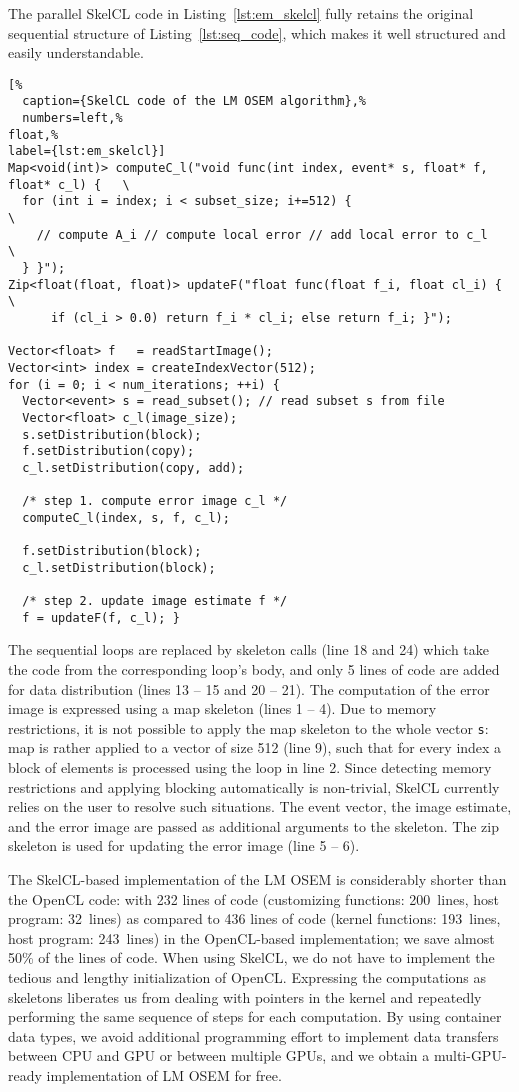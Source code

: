 The parallel SkelCL code in Listing~\ref{lst:em_skelcl} fully retains the original sequential structure of Listing~\ref{lst:seq_code}, which makes it well structured and easily understandable.
\begin{lstlisting}[%
  caption={SkelCL code of the LM OSEM algorithm},%
  numbers=left,%
float,%
label={lst:em_skelcl}]
Map<void(int)> computeC_l("void func(int index, event* s, float* f, float* c_l) {   \
  for (int i = index; i < subset_size; i+=512) {                                    \
    // compute A_i // compute local error // add local error to c_l                 \
  } }");
Zip<float(float, float)> updateF("float func(float f_i, float cl_i) {               \
      if (cl_i > 0.0) return f_i * cl_i; else return f_i; }");

Vector<float> f   = readStartImage();
Vector<int> index = createIndexVector(512);
for (i = 0; i < num_iterations; ++i) {
  Vector<event> s = read_subset(); // read subset s from file
  Vector<float> c_l(image_size);
  s.setDistribution(block);
  f.setDistribution(copy);
  c_l.setDistribution(copy, add);

  /* step 1. compute error image c_l */
  computeC_l(index, s, f, c_l);

  f.setDistribution(block);
  c_l.setDistribution(block);

  /* step 2. update image estimate f */
  f = updateF(f, c_l); }
\end{lstlisting}
The sequential loops are replaced by skeleton calls (line 18 and 24) which take the code from the corresponding loop's body, and only 5 lines of code are added for data distribution (lines 13 -- 15 and 20 -- 21).
The computation of the error image is expressed using a map skeleton (lines 1 -- 4).
Due to memory restrictions, it is not possible to apply the map skeleton to the whole vector \texttt{s}:
map is rather applied to a vector of size 512 (line 9), such that for every index a block of elements is processed using the loop in line 2.
Since detecting memory restrictions and applying blocking automatically is non-trivial, SkelCL currently relies on the user to resolve such situations.
The event vector, the image estimate, and the error image are passed as additional arguments to the skeleton.
The zip skeleton is used for updating the error image (line 5 -- 6).

The SkelCL-based implementation of the LM OSEM is considerably shorter than the OpenCL code:
with 232 lines of code (customizing functions: 200~lines, host program: 32~lines) as compared to 436 lines of code (kernel functions: 193~lines, host program: 243~lines) in the OpenCL-based implementation; we save almost 50\% of the lines of code.
When using SkelCL, we do not have to implement the tedious and lengthy initialization of OpenCL.
Expressing the computations as skeletons liberates us from dealing with pointers in the kernel and repeatedly performing the same sequence of steps for each computation.
By using container data types, we avoid additional programming effort to implement data transfers between CPU and GPU or between multiple GPUs, and we obtain a multi-GPU-ready implementation of LM OSEM for free.


